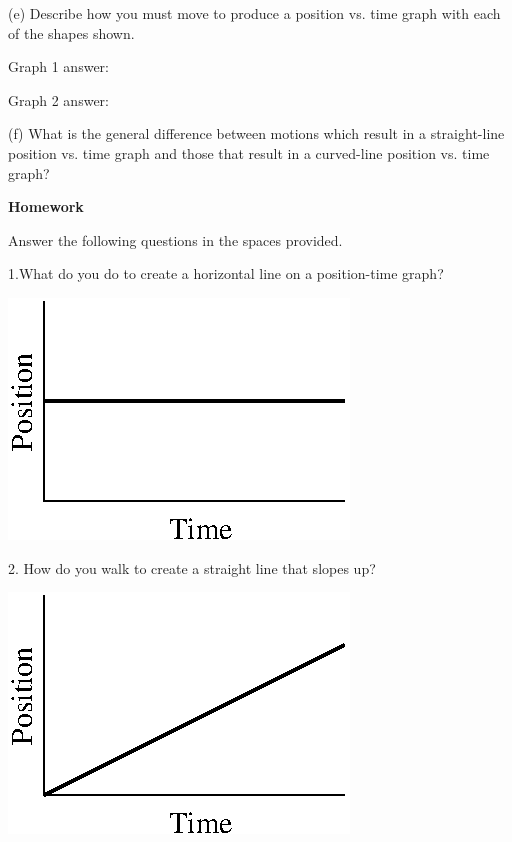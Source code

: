 (e) Describe how you must move to produce a position vs. time graph with each
of the shapes shown.

Graph 1 answer:
\vspace{10mm}

Graph 2 answer:
\vspace{10mm}

(f) What is the general difference between motions which result in a straight-line
position vs. time graph and those that result in a curved-line position vs.
time graph?
\vspace{20mm}

\textbf{Homework} 

Answer the following questions in the spaces provided.

1.What do you do to create a horizontal line on a position-time graph?

\vspace{0.3cm}
{\par\raggedright \includegraphics{position_fig5.eps} \par}
\vspace{0.3cm}

2. How do you walk to create a straight line that slopes up?

\vspace{0.3cm}
{\par\raggedright \includegraphics{position_fig6.eps} \par}
\vspace{0.3cm}

